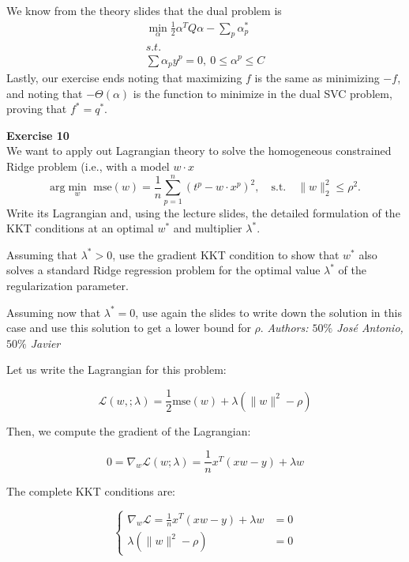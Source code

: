\documentclass[11pt,table]{article}
\newenvironment{problem}[2][Exercise]
{ \begin{mdframed}[backgroundcolor=gray!20] \textbf{#1 #2} \\}
	{\hspace{0.0cm}\newline\newline \emph{Authors: \(50\%\) José Antonio, \(50\%\) Javier}  \end{mdframed}}
\newcommand\norm[1]{\lVert#1\rVert}
\begin{document}
We know from the theory slides that the dual problem is
\begin{align*}
	\min_{\alpha} \frac{1}{2}\alpha^T Q \alpha - \sum_p \alpha^*_p \\
	s.t.                                                           \\
	\sum \alpha_p y^p = 0, \ 0 \leq \alpha^p \leq C
\end{align*}
Lastly, our exercise ends noting that maximizing \(f\) is the same as minimizing \(-f\), and noting that \(-\Theta(\alpha)\) is the function to minimize in the dual SVC problem, proving that \(f^* = q^*\).\\




\begin{problem}{10}
We want to apply out Lagrangian theory to solve the homogeneous constrained Ridge problem (i.e., with a model \(w\cdot x\)
\[
	\text{arg}\min_{w} \text{ mse}(w) = \frac{1}{n} \sum_{p=1}^n (t^p - w \cdot x^p)^2, \quad \text{s.t.} \quad \norm{w}_2^2 \leq \rho^2.
\]
Write its Lagrangian and, using the lecture slides, the detailed formulation of the KKT conditions at an optimal \(w^*\) and multiplier \(\lambda^*\).

Assuming that \(\lambda^* > 0\), use the gradient KKT condition to show that \(w^*\) also solves a standard Ridge regression problem for the optimal value \(\lambda^*\) of the regularization parameter.

Assuming now that \(\lambda^* = 0\), use again the slides to write down the solution in this case and use this solution to get a lower bound for \(\rho\).
\end{problem}

Let us write the Lagrangian for this problem:

\[
	\mathcal L(w, ; \lambda) = \frac{1}{2} \text{mse}(w) + \lambda \left(\parallel w \parallel^2 - \rho\right)
\]

Then, we compute the gradient of the Lagrangian:

\[
	0 = \nabla_w \mathcal L(w; \lambda) = \frac{1}{n}x^T(xw - y) + \lambda w
\]

The complete KKT conditions are:

\begin{equation*}
	\begin{cases}
		\nabla_w \mathcal L = \frac{1}{n}x^T(xw - y) + \lambda w & = 0 \\
		\lambda \left(\parallel w \parallel^2 - \rho\right)      & = 0
	\end{cases}
\end{equation*}
\end{document}
